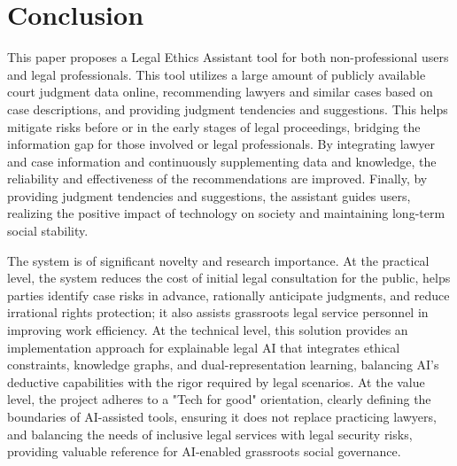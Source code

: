\documentclass[conference]{IEEEtran}
\begin{document}
\section{Conclusion}

This paper proposes a Legal Ethics Assistant tool for both non-professional users and legal professionals. This tool utilizes a large amount of publicly available court judgment data online, recommending lawyers and similar cases based on case descriptions, and providing judgment tendencies and suggestions. This helps mitigate risks before or in the early stages of legal proceedings, bridging the information gap for those involved or legal professionals. By integrating lawyer and case information and continuously supplementing data and knowledge, the reliability and effectiveness of the recommendations are improved. Finally, by providing judgment tendencies and suggestions, the assistant guides users, realizing the positive impact of technology on society and maintaining long-term social stability.

The system is of significant novelty and research importance.
At the practical level, the system reduces the cost of initial legal consultation for the public, helps parties identify case risks in advance, rationally anticipate judgments, and reduce irrational rights protection; it also assists grassroots legal service personnel in improving work efficiency.
At the technical level, this solution provides an implementation approach for explainable legal AI that integrates ethical constraints, knowledge graphs, and dual-representation learning, balancing AI's deductive capabilities with the rigor required by legal scenarios.
At the value level, the project adheres to a "Tech for good" orientation, clearly defining the boundaries of AI-assisted tools, ensuring it does not replace practicing lawyers, and balancing the needs of inclusive legal services with legal security risks, providing valuable reference for AI-enabled grassroots social governance.
\end{document}

